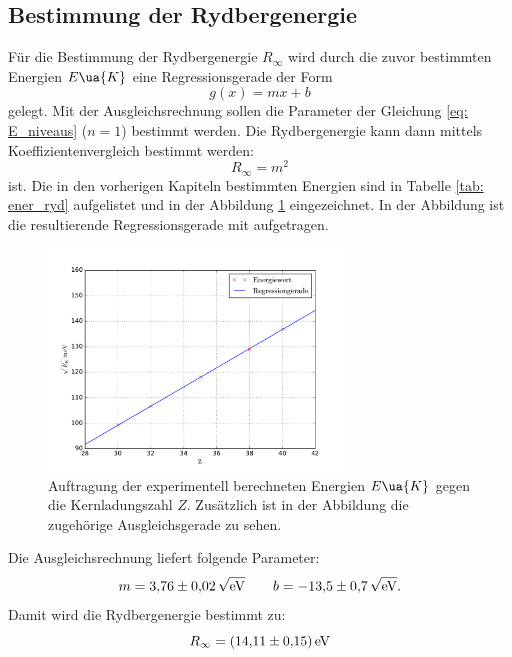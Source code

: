 \subsection{Bestimmung der Rydbergenergie}
Für die Bestimmung der Rydbergenergie $R_\infty$ wird durch die zuvor %
bestimmten Energien $E\ua{K}$ eine Regressionsgerade der Form
\begin{equation*}
  g(x)=mx+b
\end{equation*}
gelegt. Mit der Ausgleichsrechnung sollen die Parameter der Gleichung \eqref{eq: E_niveaus} ($n=1$)
bestimmt werden.
Die Rydbergenergie kann dann mittels Koeffizientenvergleich bestimmt werden:
\begin{equation*}
  R_\infty=m^2
\end{equation*}
ist. %
Die in den vorherigen Kapiteln bestimmten Energien sind in Tabelle \ref{tab: ener_ryd} aufgelistet %
und in der Abbildung \ref{fig: ryd_ener} eingezeichnet. In der Abbildung ist %
die resultierende Regressionsgerade mit aufgetragen.

\begin{figure}
  \centering
  \includegraphics[width=0.7\textwidth]{../Messdaten/energie_z.pdf}
  \caption{Auftragung der experimentell berechneten Energien $E\ua{K}$ gegen die Kernladungszahl $Z$. Zusätzlich ist in der Abbildung die zugehörige Ausgleichsgerade zu sehen.} %
  \label{fig: ryd_ener}
\end{figure}
Die Ausgleichsrechnung liefert folgende Parameter:
\begin{equation*}
m=\num{3.76\pm0.02}\,\sqrt{\si{\eV}} \qquad b=\num{-13.5\pm0.7}\,\sqrt{\si{\eV}}.
\end{equation*}
Damit wird die Rydbergenergie bestimmt zu:
\begin{equation}
  R_\infty=\SI{14.11\pm0.15}{\eV}
\end{equation}
\FloatBarrier
